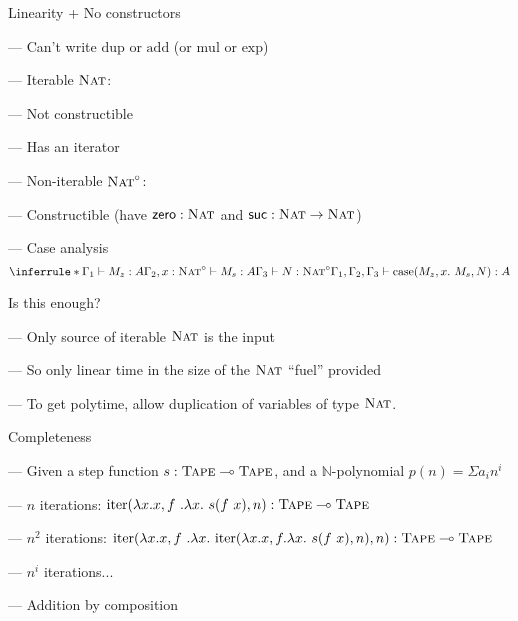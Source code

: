 \documentclass[xetex,serif,mathserif,aspectratio=169]{beamer}
\newcommand{\youtem}{\quad \textcolor{titlered!80}{---} \quad}
\newcommand{\HEAD}[1]{\textcolor{titlered}{#1}}
\begin{document}
\begin{frame}
  \HEAD{Linearity + No constructors}

  \medskip

  \youtem Can't write $\mathrm{dup}$ or $\mathrm{add}$ (or $\mathrm{mul}$ or $\mathrm{exp}$)

  \pause
  \bigskip

  \youtem Iterable $\textsc{Nat}$:

  \quad \youtem Not constructible

  \quad \youtem Has an iterator

  \pause
  \bigskip

  \youtem Non-iterable $\textsc{Nat}^\circ$:

  \quad \youtem Constructible (have $\mathsf{zero} : \textsc{Nat}$ and $\mathsf{suc} : \textsc{Nat} \to \textsc{Nat}$)

  \quad \youtem Case analysis
  \begin{displaymath}
    \inferrule*
    {\Gamma_1 \vdash M_z : A \\ \Gamma_2, x : \TyNat^\circ \vdash M_s : A \\ \Gamma_3 \vdash N : \TyNat^\circ}
    {\Gamma_1, \Gamma_2, \Gamma_3 \vdash \mathrm{case}(M_z, x.~M_s, N) : A}
  \end{displaymath}

\end{frame}

\begin{frame}
  \HEAD{Is this enough?}

  \bigskip

  \youtem Only source of iterable $\textsc{Nat}$ is the input

  \smallskip

  \youtem So only linear time in the size of the $\textsc{Nat}$ ``fuel'' provided

  \smallskip

  \youtem To get polytime, allow duplication of variables of type $\textsc{Nat}$.

  \bigskip
  \pause

  \HEAD{Completeness}

  \medskip

  \youtem Given a step function $s : \textsc{Tape} \multimap \textsc{Tape}$, and a $\mathbb{N}$-polynomial $p(n) = \Sigma a_i n^i$

  \smallskip

  \youtem $n$ iterations: $\mathrm{iter}(\lambda x.x, f~.\lambda x.~s(f~x), n) : \textsc{Tape} \multimap \textsc{Tape}$

  \smallskip

  \youtem $n^2$ iterations: $\mathrm{iter}(\lambda x.x, f~.\lambda x.~\mathrm{iter}(\lambda x.x, f.\lambda x.~s(f~x),n), n) : \textsc{Tape} \multimap \textsc{Tape}$

  \smallskip

  \youtem $n^i$ iterations...

  \smallskip

  \youtem Addition by composition
\end{frame}
\end{document}
